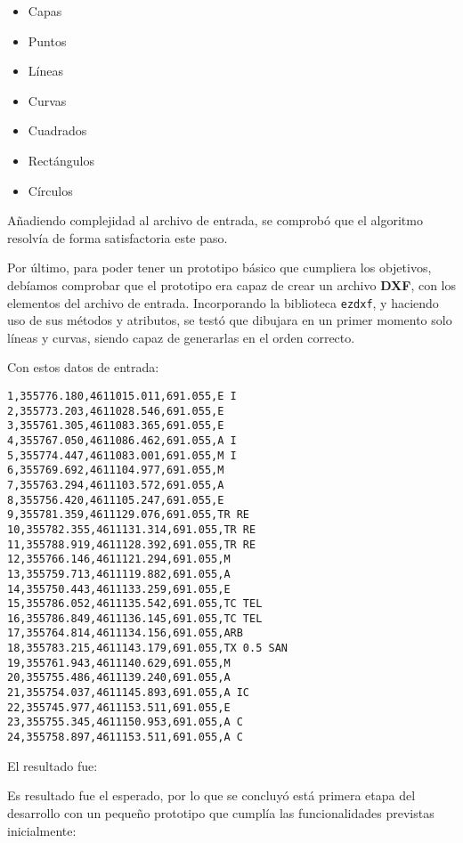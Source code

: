 \begin{itemize}
\item Capas
\item Puntos
\item Líneas
\item Curvas
\item Cuadrados
\item Rectángulos 
\item Círculos
\end{itemize}

Añadiendo complejidad al archivo de entrada, se comprobó que el algoritmo resolvía de forma satisfactoria este paso.

Por último, para poder tener un prototipo básico que cumpliera los objetivos, debíamos comprobar que el prototipo era capaz de crear un archivo \textbf{DXF}, con los elementos del archivo de entrada. Incorporando la biblioteca \texttt{ezdxf}, y haciendo uso de sus métodos y atributos, se testó que dibujara en un primer momento solo líneas y curvas, siendo capaz de generarlas en el orden correcto.

Con estos datos de entrada:

\begin{verbatim}
1,355776.180,4611015.011,691.055,E I
2,355773.203,4611028.546,691.055,E
3,355761.305,4611083.365,691.055,E
4,355767.050,4611086.462,691.055,A I
5,355774.447,4611083.001,691.055,M I
6,355769.692,4611104.977,691.055,M
7,355763.294,4611103.572,691.055,A
8,355756.420,4611105.247,691.055,E
9,355781.359,4611129.076,691.055,TR RE
10,355782.355,4611131.314,691.055,TR RE
11,355788.919,4611128.392,691.055,TR RE
12,355766.146,4611121.294,691.055,M
13,355759.713,4611119.882,691.055,A
14,355750.443,4611133.259,691.055,E
15,355786.052,4611135.542,691.055,TC TEL
16,355786.849,4611136.145,691.055,TC TEL
17,355764.814,4611134.156,691.055,ARB
18,355783.215,4611143.179,691.055,TX 0.5 SAN
19,355761.943,4611140.629,691.055,M
20,355755.486,4611139.240,691.055,A
21,355754.037,4611145.893,691.055,A IC
22,355745.977,4611153.511,691.055,E
23,355755.345,4611150.953,691.055,A C
24,355758.897,4611153.511,691.055,A C
\end{verbatim}

El resultado fue:


Es resultado fue el esperado, por lo que se concluyó está primera etapa del desarrollo con un pequeño prototipo que cumplía las funcionalidades previstas inicialmente:

